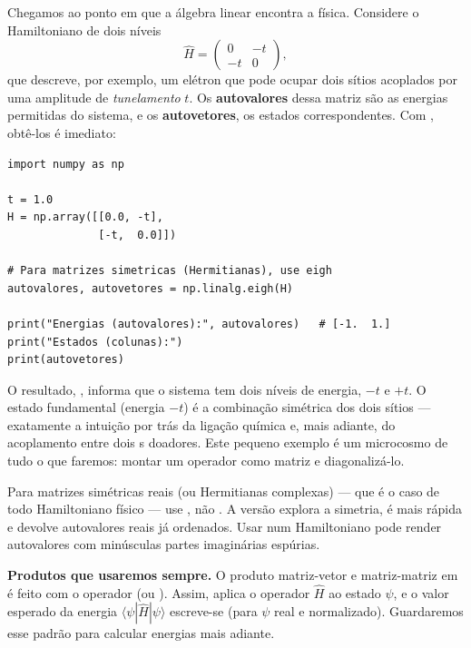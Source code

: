 Chegamos ao ponto em que a álgebra linear encontra a física. Considere o
Hamiltoniano de dois níveis
\[
  \hat{H} = \begin{pmatrix} 0 & -t \\ -t & 0 \end{pmatrix},
\]
que descreve, por exemplo, um elétron que pode ocupar dois sítios acoplados por
uma amplitude de \emph{tunelamento} $t$. Os \textbf{autovalores} dessa matriz são as
energias permitidas do sistema, e os \textbf{autovetores}, os estados
correspondentes. Com \numpy{}, obtê-los é imediato:

\begin{lstlisting}[style=python,caption={Autovalores e autovetores de um Hamiltoniano 2x2.},label={lst:eig}]
import numpy as np

t = 1.0
H = np.array([[0.0, -t],
              [-t,  0.0]])

# Para matrizes simetricas (Hermitianas), use eigh
autovalores, autovetores = np.linalg.eigh(H)

print("Energias (autovalores):", autovalores)   # [-1.  1.]
print("Estados (colunas):")
print(autovetores)
\end{lstlisting}

\noindent
O resultado, \code{[-1.\ 1.]}, informa que o sistema tem dois níveis de energia,
$-t$ e $+t$. O estado fundamental (energia $-t$) é a combinação simétrica dos dois
sítios --- exatamente a intuição por trás da ligação química e, mais adiante, do
acoplamento entre dois \qubit{}s doadores. Este pequeno exemplo é um microcosmo de
tudo o que faremos: montar um operador como matriz e diagonalizá-lo.

\begin{caixaatencao}
Para matrizes simétricas reais (ou Hermitianas complexas) --- que é o caso de
todo Hamiltoniano físico --- use , não . A
versão  explora a simetria, é mais rápida e devolve autovalores reais já
ordenados. Usar  num Hamiltoniano pode render autovalores com minúsculas
partes imaginárias espúrias.
\end{caixaatencao}

\begin{caixanota}
\textbf{Produtos que usaremos sempre.} O produto matriz-vetor e matriz-matriz em
\numpy{} é feito com o operador  (ou ). Assim,  aplica
o operador $\hat H$ ao estado $\psi$, e o valor esperado da energia
$\langle\psi|\hat H|\psi\rangle$ escreve-se  (para $\psi$ real e
normalizado). Guardaremos esse padrão para calcular energias mais adiante.
\end{caixanota}

